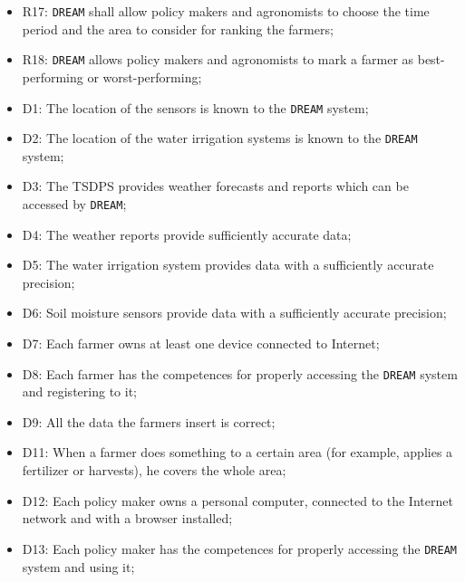 \documentclass{article}
\begin{document}
\begin{itemize}
    \item R17: \verb|DREAM| shall allow policy makers and agronomists to choose the time period and the area to consider for ranking the farmers;
    
    \item R18: \verb|DREAM| allows policy makers and agronomists to mark a farmer as best-performing or worst-performing;
    
    \item D1: The location of the sensors is known to the \verb|DREAM| system;
    
    \item D2: The location of the water irrigation systems is known to the \verb|DREAM| system;
    
    \item D3: The TSDPS provides weather forecasts and reports which can be accessed by \verb|DREAM|;
    
    \item D4: The weather reports provide sufficiently accurate data;
    
    \item D5: The water irrigation system provides data with a sufficiently accurate precision;
    
    \item D6: Soil moisture sensors provide data with a sufficiently accurate precision;
    
    \item D7: Each farmer owns at least one device connected to Internet;
    
    \item D8: Each farmer has the competences for properly accessing the \verb|DREAM| system and registering to it;
    
    \item D9: All the data the farmers insert is correct;
    
    \item D11: When a farmer does something to a certain area (for example, applies a fertilizer or harvests), he covers the whole area;
    
    \item D12: Each policy maker owns a personal computer, connected to the Internet network and with a browser installed;
    
    \item D13: Each policy maker has the competences for properly accessing the \verb|DREAM| system and using it;
    

\end{itemize}
\end{document}
